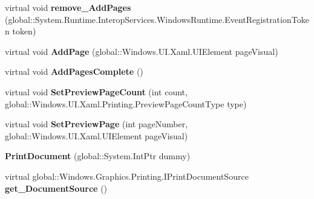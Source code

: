 \begin{DoxyCompactItemize}
virtual void {\bfseries remove\+\_\+\+Add\+Pages} (global\+::\+System.\+Runtime.\+Interop\+Services.\+Windows\+Runtime.\+Event\+Registration\+Token token)
\item 
\mbox{\label{class_windows_1_1_u_i_1_1_xaml_1_1_printing_1_1_print_document_ab73e0795893f75e4c311206a05f5604e}} 
virtual void {\bfseries Add\+Page} (global\+::\+Windows.\+U\+I.\+Xaml.\+U\+I\+Element page\+Visual)
\item 
\mbox{\label{class_windows_1_1_u_i_1_1_xaml_1_1_printing_1_1_print_document_a86b1ab90c519769c55161873f7402602}} 
virtual void {\bfseries Add\+Pages\+Complete} ()
\item 
\mbox{\label{class_windows_1_1_u_i_1_1_xaml_1_1_printing_1_1_print_document_acdb1e1f03c6ad6617b2045feee076bb1}} 
virtual void {\bfseries Set\+Preview\+Page\+Count} (int count, global\+::\+Windows.\+U\+I.\+Xaml.\+Printing.\+Preview\+Page\+Count\+Type type)
\item 
\mbox{\label{class_windows_1_1_u_i_1_1_xaml_1_1_printing_1_1_print_document_a9b89dc73b3d3108f6a9a5bbda7805863}} 
virtual void {\bfseries Set\+Preview\+Page} (int page\+Number, global\+::\+Windows.\+U\+I.\+Xaml.\+U\+I\+Element page\+Visual)
\item 
\mbox{\label{class_windows_1_1_u_i_1_1_xaml_1_1_printing_1_1_print_document_ac0c6ca7b864f685e2f0989f778c41e72}} 
{\bfseries Print\+Document} (global\+::\+System.\+Int\+Ptr dummy)
\item 
\mbox{\label{class_windows_1_1_u_i_1_1_xaml_1_1_printing_1_1_print_document_a58bc53aad6d052d4b2a25935ba3f7844}} 
virtual global\+::\+Windows.\+Graphics.\+Printing.\+I\+Print\+Document\+Source {\bfseries get\+\_\+\+Document\+Source} ()
\item 
\mbox{\label{class_windows_1_1_u_i_1_1_xaml_1_1_printing_1_1_print_document_a9c15072b2efeea170b01106af19c20d2}} 

\end{DoxyCompactItemize}
